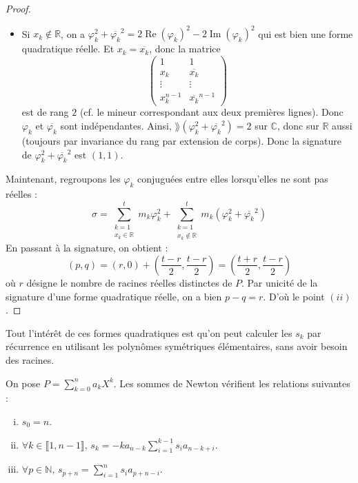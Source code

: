 \begin{proof}
\begin{itemize}
			\item Si $x_k \notin \mathbb{R}$, on a $\varphi_k^2 + \overline{\varphi_k}^2 = 2 \operatorname{Re}(\varphi_k)^2 - 2 \operatorname{Im}(\varphi_k)^2$ qui est bien une forme quadratique réelle. Et $x_k = \overline{x_k}$, donc la matrice
			\[ \begin{pmatrix} 1 & 1 \\ x_k & \overline{x_k} \\ \vdots & \vdots \\ x_k^{n-1} & \overline{x_k}^{n-1} \end{pmatrix} \]
			est de rang $2$ (cf. le mineur correspondant aux deux premières lignes). Donc $\varphi_k$ et $\overline{\varphi_k}$ sont indépendantes. Ainsi, $\rang(\varphi_k^2 + \overline{\varphi_k}^2) = 2$ sur $\mathbb{C}$, donc sur $\mathbb{R}$ aussi (toujours par invariance du rang par extension de corps). Donc la signature de $\varphi_k^2 + \overline{\varphi_k}^2$ est $(1, 1)$.
		\end{itemize}
		Maintenant, regroupons les $\varphi_k$ conjuguées entre elles lorsqu'elles ne sont pas réelles :
		\[ \sigma = \sum_{\substack{k=1 \\ x_k \in \mathbb{R}}}^t m_k \varphi_k^2 + \sum_{\substack{k=1 \\ x_k \notin \mathbb{R}}}^t m_k (\varphi_k^2 + \overline{\varphi_k}^2) \]
		En passant à la signature, on obtient :
		\[ (p, q) = (r, 0) + \left( \frac{t-r}{2}, \frac{t-r}{2} \right) = \left( \frac{t+r}{2}, \frac{t-r}{2} \right) \]
		où $r$ désigne le nombre de racines réelles distinctes de $P$. Par unicité de la signature d’une forme quadratique réelle, on a bien $p-q=r$. D'où le point $(ii)$.
	\end{proof}

	\begin{remark}
		Tout l'intérêt de ces formes quadratiques est qu'on peut calculer les $s_k$ par récurrence en utilisant les polynômes symétriques élémentaires, sans avoir besoin des racines.
	\end{remark}


	\begin{proposition}
		On pose $P = \sum_{k=0}^n a_k X^k$. Les sommes de Newton vérifient les relations suivantes :
		\begin{enumerate}[(i)]
			\item $s_0 = n$.
			\item $\forall k \in \llbracket 1, n-1 \rrbracket, \, s_k = -k a_{n-k} \sum_{i=1}^{k-1} s_i a_{n-k+i}$.
			\item $\forall p \in \mathbb{N}, \, s_{p+n} = \sum_{i=1}^{n} s_i a_{p+n-i}$.
		\end{enumerate}
	\end{proposition}


